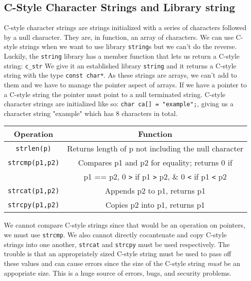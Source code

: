 \documentclass[12pt, a4paper]{report}
\begin{document}
\subsection{C-Style Character Strings and Library string}
C-style character strings are strings initialized with a series of characters followed by a null character.
They are, in function, an array of characters.
We can use C-style strings when we want to use library \verb|string|s but we can't do the reverse.
Luckily, the \verb|string| library has a member function that lets us return a C-style string: \verb|c_str|
We give it an established library \verb|string| and it returns a C-style string with the type \verb|const char*|.
As these strings are arrays, we can't add to them and we have to manage the pointer aspect of arrays.
If we have a pointer to a C-style string the pointer must point to a null terminated string.
C-style character strings are initialized like so: \verb|char ca[] = "example";|,
giving us a character string "example" which has 8 characters in total.
\begin{center}
  \begin{tabular}{ |c|c| }
    \hline
    \textbf{Operation} & \textbf{Function} \\
    \hline
    \verb|strlen(p)| & Returns length of p not including the null character \\
    \hline
    \verb|strcmp(p1,p2)| & Compares p1 and p2 for equality; returns 0 if \\
                         & p1 == p2, 0 \verb|>| if p1 \verb|>| p2, \& 0 \verb|<| if p1 \verb|<| p2 \\
                         \hline
    \verb|strcat(p1,p2)| & Appends p2 to p1, returns p1 \\
    \hline
    \verb|strcpy(p1,p2)| & Copies p2 into p1, returns p1 \\
    \hline
  \end{tabular}
\end{center}
We cannot compare C-style strings since that would be an operation on pointers, we must use \verb|strcmp|.
We also cannot directly cocantenate and copy C-style strings into one another, \verb|strcat| and \verb|strcpy| must be used respectively.
The trouble is that an appropriately sized C-style string must be used to pass off these values and can cause errors since the 
size of the C-style string \emph{must} be an appopriate size.
This is a huge source of errors, bugs, and security problems.
\end{document}
